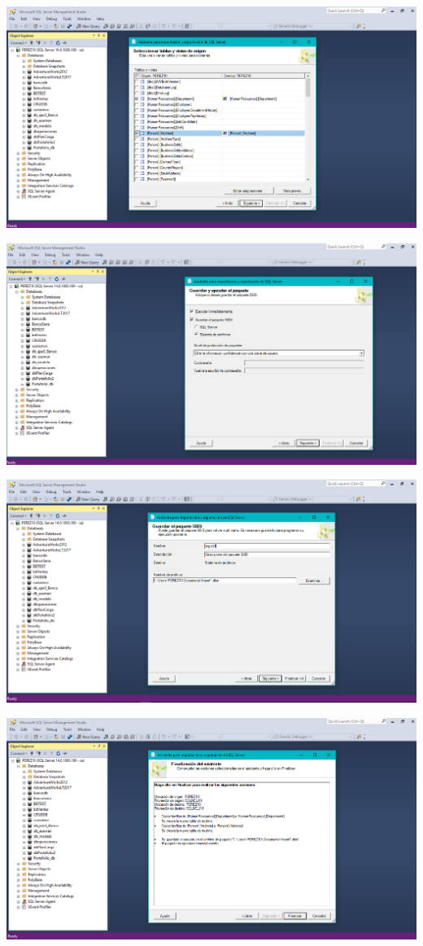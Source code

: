 {\begin{center}
\includegraphics[width=15cm]{./Imagenes/imagen7}
\end{center}
\begin{center}
\includegraphics[width=15cm]{./Imagenes/imagen8}
\end{center}
\begin{center}
\includegraphics[width=15cm]{./Imagenes/imagen9}
\end{center}
\begin{center}
\includegraphics[width=15cm]{./Imagenes/imagen10}

\end{center}}
